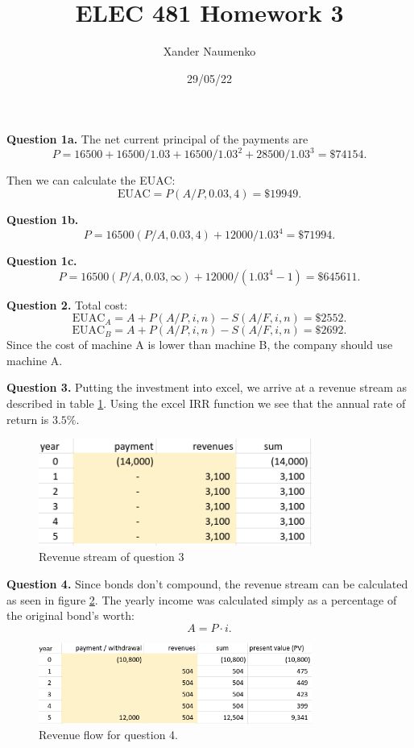 \documentclass[letterpaper, reqno,11pt]{article}
\begin{document}
\title{ELEC 481 Homework 3}
\date{29/05/22}
\author{Xander Naumenko}
\maketitle


{\noindent\bf Question 1a.} The net current principal of the payments are 
\[
P=16500+16500/ 1.03+16500/ 1.03^{2}+28500/ 1.03^{3}=\$74154
.\]

Then we can calculate the EUAC: 
\[
\text{EUAC}=P (A /P, 0.03, 4)=\$19949
.\]

{\noindent\bf Question 1b.} 
\[
P=16500(P /A, 0.03, 4)+12000 / 1.03^{4}=\$71994
.\]

{\noindent\bf Question 1c.} 
\[
P=16500(P /A, 0.03, \infty)+12000 / (1.03^{4}-1)=\$645611
.\]

{\noindent\bf Question 2.} Total cost: 
\[
\text{EUAC}_A=A+P(A /P, i, n)-S (A/F, i, n)=\$2552
.\]
\[
\text{EUAC}_B=A+P(A /P, i, n)-S (A/F, i, n)=\$2692
.\]
Since the cost of machine A is lower than machine B, the company should use machine A. 

{\noindent\bf Question 3.} Putting the investment into excel, we arrive at a revenue stream as described in table \ref{fig:q3}. Using the excel IRR function we see that the annual rate of return is $3.5\%$. 

\begin{figure}[htpb]
    \centering
    \includegraphics[width=0.8\textwidth]{q3}
    \caption{Revenue stream of question 3}
    \label{fig:q3}
\end{figure}

{\noindent\bf Question 4.} Since bonds don't compound, the revenue stream can be calculated as seen in figure \ref{fig:q4}. The yearly income was calculated simply as a percentage of the original bond's worth: 
\[
A=P\cdot i
.\]

\begin{figure}[htpb]
    \centering
    \includegraphics[width=0.8\textwidth]{q4}
    \caption{Revenue flow for question 4. }
    \label{fig:q4}
\end{figure}
\end{document}
